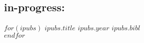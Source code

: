\documentclass[]{friggeri-cv}
\begin{document}
\vspace{-0.15in}
\subsection{in-progress:}
\begin{entrylist}
$for(ipubs)$
  \entrypub
  {$ipubs.title$}
  {$ipubs.year$}
  {$ipubs.bibl$}\\
$endfor$
\end{entrylist}



\end{document}
